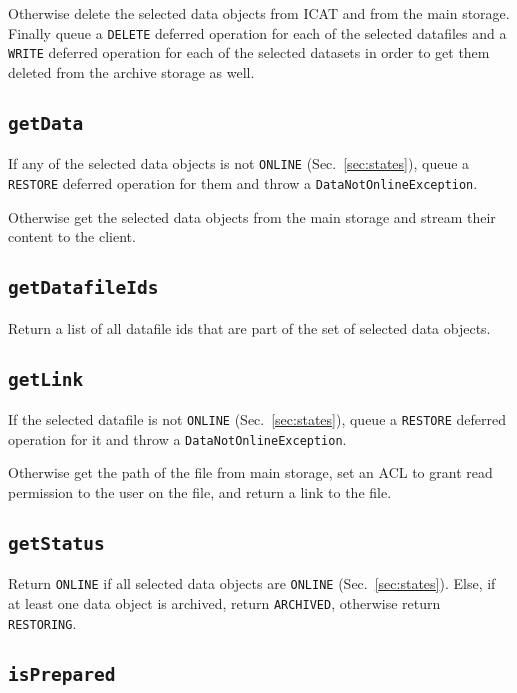 \documentclass[paper=a4]{scrartcl}
\begin{document}
Otherwise delete the selected data objects from ICAT and from the main
storage.  Finally queue a \texttt{DELETE} deferred operation for each
of the selected datafiles and a \texttt{WRITE} deferred operation for
each of the selected datasets in order to get them deleted from the
archive storage as well.

\subsection{\texttt{getData}}
\label{sec:requests:getdata}

If any of the selected data objects is not \texttt{ONLINE}
(Sec.~\ref{sec:states}), queue a \texttt{RESTORE} deferred operation
for them and throw a \texttt{DataNotOnlineException}.

Otherwise get the selected data objects from the main storage and
stream their content to the client.

\subsection{\texttt{getDatafileIds}}

Return a list of all datafile ids that are part of the set of
selected data objects.

\subsection{\texttt{getLink}}
\label{sec:requests:getlink}

If the selected datafile is not \texttt{ONLINE}
(Sec.~\ref{sec:states}), queue a \texttt{RESTORE} deferred operation
for it and throw a \texttt{DataNotOnlineException}.

Otherwise get the path of the file from main storage, set an ACL to
grant read permission to the user on the file, and return a link to
the file.

\subsection{\texttt{getStatus}}

Return \texttt{ONLINE} if all selected data objects are
\texttt{ONLINE} (Sec.~\ref{sec:states}).  Else, if at least one data
object is archived, return \texttt{ARCHIVED}, otherwise return
\texttt{RESTORING}.

\subsection{\texttt{isPrepared}}
\end{document}
